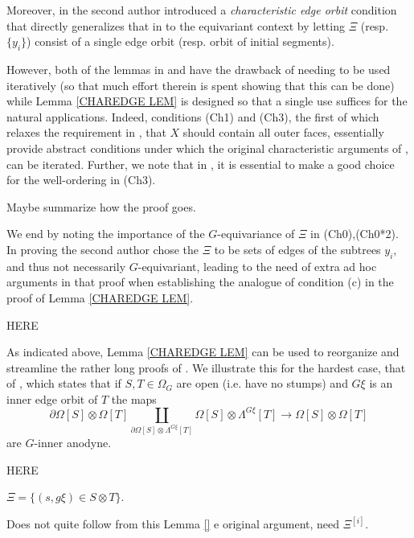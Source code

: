 \documentclass[a4paper,10pt,draft]{article}%
\begin{document}
\begin{remark}
\begin{itemize}
Moreover, in \cite[Lemma 7.39]{Per17} the second author introduced a \textit{characteristic edge orbit} condition that directly generalizes that in \cite{MW09}
to the equivariant context 
by letting $\Xi$ (resp. $\{y_i\}$) consist of a single edge orbit (resp. orbit of initial segments).

However, both of the lemmas in \cite{MW09} and \cite{Per17}
have the drawback of needing to be used iteratively
(so that much effort therein is spent showing that this can be done) while Lemma \ref{CHAREDGE LEM} is designed so that a single use suffices for the natural applications.
Indeed, conditions (Ch1) and (Ch3), the first of which relaxes the requirement in \cite{MW09},\cite{Per17} that $X$ should contain all outer faces, essentially provide abstract conditions under which the original characteristic arguments of \cite{MW09},\cite{Per17} can be iterated.
Further, we note that in \cite{MW09},\cite{Per17} it is essential to make a good choice for the well-ordering in (Ch3).

{\color{blue} Maybe summarize how the proof goes.}

We end by noting the importance of the $G$-equivariance of $\Xi$
in (Ch0),(Ch0*2). In proving \cite[Prop. 7.44]{Per17} the second author chose the $\Xi$ to be sets of edges of the subtrees $y_i$, and thus not necessarily $G$-equivariant,
leading to the need of extra ad hoc arguments in that proof when establishing the analogue of condition (c) in the proof of Lemma \ref{CHAREDGE LEM}.
\end{itemize}
\end{remark}


{\color{red}HERE}

\begin{example}
	As indicated above, Lemma \ref{CHAREDGE LEM} can be used to
	reorganize and streamline the rather long proofs of \cite[Thms 7.1 and 7.2]{Per17}. We illustrate this for the hardest case, that of \cite[Thm. 7.1(i)]{Per17}, which states that if
	$S,T \in \Omega_G$ are open (i.e. have no stumps) and
	$G \xi$ is an inner edge orbit of $T$ the maps
\begin{equation}\label{THM71 EQ}
	\partial \Omega[S] \otimes \Omega[T]
		\coprod_{\partial \Omega[S] \otimes \Lambda^{G\xi}[T]}
	\Omega[S] \otimes \Lambda^{G\xi}[T]
\to
	 \Omega[S] \otimes \Omega[T]
\end{equation}
are $G$-inner anodyne.

{\color{red}HERE}

$\Xi = \{(s,g\xi) \in S\otimes T\}$.

{\color{blue} Does not quite follow from this Lemma \ref{}
e original argument, need $\Xi^{[i]}$}.

\end{example}
\end{document}
